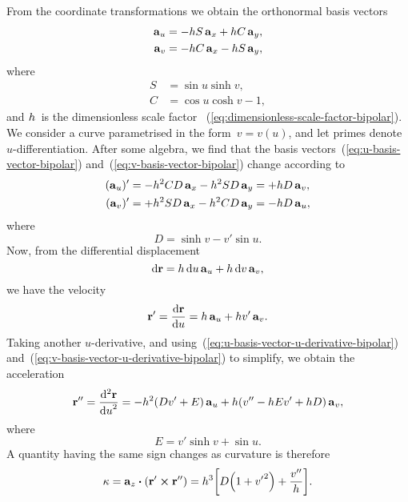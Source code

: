 From the coordinate transformations
we obtain the orthonormal basis vectors
\begin{align}
  \basisvec{u} &= -\scalefac S \basisvec{x} + \scalefac C \basisvec{y},
    \label{eq:u-basis-vector-bipolar} \\
  \basisvec{v} &= -\scalefac C \basisvec{x} - \scalefac S \basisvec{y},
    \label{eq:v-basis-vector-bipolar}
\end{align}
where
\begin{align}
  S &= \sin u \sinh v,
    \label{eq:bipolar-abbreviation-s} \\
  C &= \cos u \cosh v - 1,
    \label{eq:bipolar-abbreviation-c}
\end{align}
and $\scalefac$~is the dimensionless scale factor~%
  (\ref{eq:dimensionless-scale-factor-bipolar}).
We consider a curve parametrised in the form~$v = v (u)$,
and let primes denote $u$-differentiation.
After some algebra, we find that
the basis vectors~(\ref{eq:u-basis-vector-bipolar})
and~(\ref{eq:v-basis-vector-bipolar})
change according to
\begin{align}
  (\basisvec{u})'
  &= -\scalefac^2 C D \basisvec{x} - \scalefac^2 S D \basisvec{y}
  = +\scalefac D \basisvec{v},
    \label{eq:u-basis-vector-u-derivative-bipolar} \\
  (\basisvec{v})'
  &= +\scalefac^2 S D \basisvec{x} - \scalefac^2 C D \basisvec{y}
  = -\scalefac D \basisvec{u},
    \label{eq:v-basis-vector-u-derivative-bipolar}
\end{align}
where
\begin{equation}
  D = \sinh v - v' \sin u.
  \label{eq:bipolar-abbreviation-d}
\end{equation}
Now, from the differential displacement
\begin{equation}
  \td\positionvec =
    \scalefac \td u \basisvec{u} + \scalefac \td v \basisvec{v},
  \label{eq:differential-displacement-bipolar}
\end{equation}
we have the velocity
\begin{equation}
  \positionvec' = \tder{\positionvec}{u} =
    \scalefac \basisvec{u} + \scalefac v' \basisvec{v}.
  \label{eq:velocity-vector-bipolar-by-u}
\end{equation}
Taking another $u$-derivative,
and using~(\ref{eq:u-basis-vector-u-derivative-bipolar})
and~(\ref{eq:v-basis-vector-u-derivative-bipolar})
to simplify,
we obtain the acceleration
\begin{equation}
  \positionvec'' = \tder[2]{\positionvec}{u} =
    - \scalefac^2 (D v' + E) \basisvec{u}
    + \scalefac (v'' - \scalefac E v' + \scalefac D) \basisvec{v},
  \label{eq:acceleration-vector-bipolar-by-u}
\end{equation}
where
\begin{equation}
  E = v' \sinh v + \sin u.
  \label{eq:bipolar-abbreviation-e}
\end{equation}
A quantity having the same sign changes as curvature is therefore
\begin{equation}
  \kappa = \basisvec{z} \dotp (\positionvec' \crossp \positionvec'') =
    \scalefac^3
    \squarebr*{D \roundbr*{1 + {v'}^2} + \frac{v''}{\scalefac}}.
  \label{eq:kappa-bipolar-by-u}
\end{equation}

